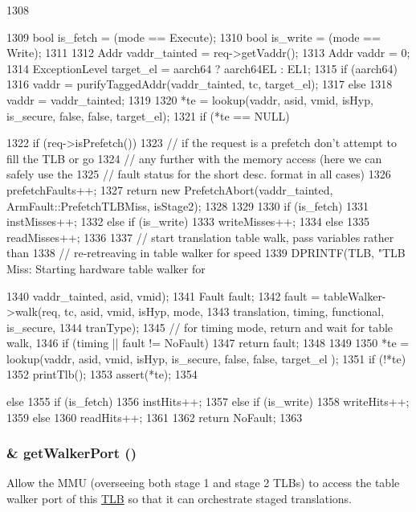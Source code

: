 \begin{DoxyCode}
1308 {
1309     bool is_fetch = (mode == Execute);
1310     bool is_write = (mode == Write);
1311 
1312     Addr vaddr_tainted = req->getVaddr();
1313     Addr vaddr = 0;
1314     ExceptionLevel target_el = aarch64 ? aarch64EL : EL1;
1315     if (aarch64) {
1316         vaddr = purifyTaggedAddr(vaddr_tainted, tc, target_el);
1317     } else {
1318         vaddr = vaddr_tainted;
1319     }
1320     *te = lookup(vaddr, asid, vmid, isHyp, is_secure, false, false, target_el);
1321     if (*te == NULL) {
1322         if (req->isPrefetch()) {
1323             // if the request is a prefetch don't attempt to fill the TLB or go
1324             // any further with the memory access (here we can safely use the
1325             // fault status for the short desc. format in all cases)
1326            prefetchFaults++;
1327            return new PrefetchAbort(vaddr_tainted, ArmFault::PrefetchTLBMiss, 
      isStage2);
1328         }
1329 
1330         if (is_fetch)
1331             instMisses++;
1332         else if (is_write)
1333             writeMisses++;
1334         else
1335             readMisses++;
1336 
1337         // start translation table walk, pass variables rather than
1338         // re-retreaving in table walker for speed
1339         DPRINTF(TLB, "TLB Miss: Starting hardware table walker for %
      
1340                 vaddr_tainted, asid, vmid);
1341         Fault fault;
1342         fault = tableWalker->walk(req, tc, asid, vmid, isHyp, mode,
1343                                   translation, timing, functional, is_secure,
1344                                   tranType);
1345         // for timing mode, return and wait for table walk,
1346         if (timing || fault != NoFault) {
1347             return fault;
1348         }
1349 
1350         *te = lookup(vaddr, asid, vmid, isHyp, is_secure, false, false, target_el
      );
1351         if (!*te)
1352             printTlb();
1353         assert(*te);
1354     } else {
1355         if (is_fetch)
1356             instHits++;
1357         else if (is_write)
1358             writeHits++;
1359         else
1360             readHits++;
1361     }
1362     return NoFault;
1363 }
\end{DoxyCode}
\hypertarget{classArmISA_1_1TLB_a3eca666205fdb5a79565d7520a5c97b9}{
\subsubsection[{getWalkerPort}]{ \& getWalkerPort ()}}
\label{classArmISA_1_1TLB_a3eca666205fdb5a79565d7520a5c97b9}
Allow the MMU (overseeing both stage 1 and stage 2 TLBs) to access the table walker port of this \hyperlink{classArmISA_1_1TLB}{TLB} so that it can orchestrate staged translations.

